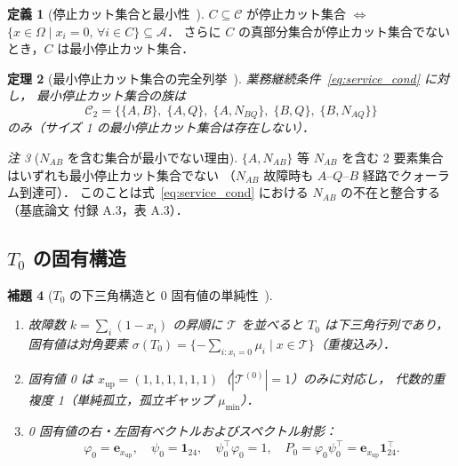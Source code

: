 \documentclass[12pt,a4paper]{article}
\theoremstyle{plain}
\newtheorem{theorem}{定理}[section]
\newtheorem{lemma}[theorem]{補題}
\theoremstyle{definition}
\newtheorem{definition}[theorem]{定義}
\theoremstyle{remark}
\newtheorem{remark}[theorem]{注}
\newcommand{\calA}{\mathcal{A}}        %
\newcommand{\calT}{\mathcal{T}}        %
\newcommand{\calC}{\mathcal{C}}        %
\newcommand{\Proj}{P}                  %
\newcommand{\calCtwo}{\mathcal{C}_2}   %
\begin{document}
\begin{definition}[停止カット集合と最小性~{\cite{habase:v7}}]\label{def:cutset}
  $C\subseteq\calC$ が停止カット集合 $\iff$
  $\{x\in\Omega \mid x_i=0,\,\forall i\in C\}\subseteq\calA$．
  さらに $C$ の真部分集合が停止カット集合でないとき，$C$ は最小停止カット集合．
\end{definition}

\begin{theorem}[最小停止カット集合の完全列挙~{\cite{habase:v7}}]\label{thm:mincut}
  業務継続条件~\eqref{eq:service_cond} に対し，
  最小停止カット集合の族は
  \begin{equation}\label{eq:mincuts}
    \calCtwo
    = \bigl\{
        \{A,B\},\;\{A,Q\},\;\{A,N_{BQ}\},\;\{B,Q\},\;\{B,N_{AQ}\}
      \bigr\}
  \end{equation}
  のみ（サイズ 1 の最小停止カット集合は存在しない）．
\end{theorem}

\begin{remark}[$N_{AB}$ を含む集合が最小でない理由]
  $\{A,N_{AB}\}$ 等 $N_{AB}$ を含む 2 要素集合はいずれも最小停止カット集合でない
  （$N_{AB}$ 故障時も $A$–$Q$–$B$ 経路でクォーラム到達可）．
  このことは式~\eqref{eq:service_cond} における $N_{AB}$ の不在と整合する
  （基底論文 付録 A.3，表 A.3）．
\end{remark}

\subsection{$T_0$ の固有構造}

\begin{lemma}[$T_0$ の下三角構造と 0 固有値の単純性~{\cite{habase:v7}}]
\label{lem:T0spec}
  \begin{enumerate}[label=(\arabic*)]
    \item 故障数 $k=\sum_i(1-x_i)$ の昇順に $\calT$ を並べると
          $T_0$ は下三角行列であり，
          固有値は対角要素
          $\sigma(T_0) = \{-\sum_{i:x_i=0}\mu_i \mid x\in\calT\}$（重複込み）．

    \item 固有値 0 は $x_{\mathrm{up}}=(1,1,1,1,1,1)$（$|\calT^{(0)}|=1$）のみに対応し，
          代数的重複度 1（単純孤立，孤立ギャップ $\mu_{\min}$）．

    \item 0 固有値の右・左固有ベクトルおよびスペクトル射影：
          \begin{equation}\label{eq:eigvec}
            \varphi_0 = \mathbf{e}_{x_{\mathrm{up}}},\quad
            \psi_0 = \mathbf{1}_{24},\quad
            \psi_0^\top\varphi_0 = 1,\quad
            \Proj_0 = \varphi_0\psi_0^\top = \mathbf{e}_{x_{\mathrm{up}}}\mathbf{1}_{24}^\top.
          \end{equation}
  \end{enumerate}
\end{lemma}
\end{document}
